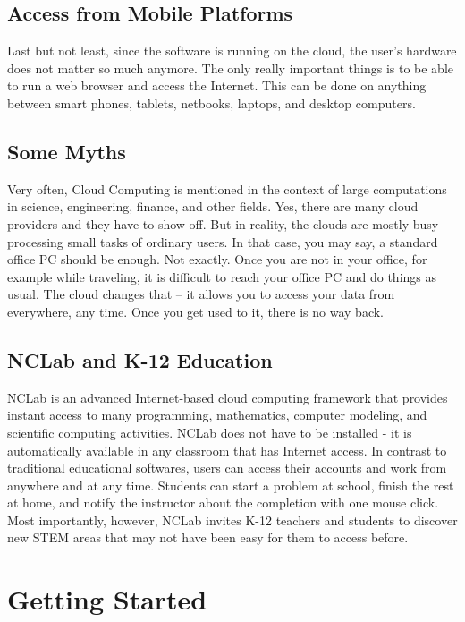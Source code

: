 \documentclass[article,A4,12pt]{llncs}
\begin{document}
\subsection{Access from Mobile Platforms}

Last but not least, since the software is running on the cloud, the user's hardware 
does not matter so much anymore. The only really important things is to be able to 
run a web browser and access the Internet. This can be done on anything between smart 
phones, tablets, netbooks, laptops, and desktop computers. 

\subsection{Some Myths}

Very often, Cloud Computing is mentioned in the context of large 
computations in science, engineering, finance, and other fields. Yes, there are many 
cloud providers and they have to show off. But in reality, the clouds are mostly
busy processing small tasks of ordinary users. In that case, you may say, a standard 
office PC should be enough. Not exactly. Once you are not in your office, for example
while traveling, it is difficult to reach your office PC and do things as usual. 
The cloud changes that -- it allows you to access your data 
from everywhere, any time. Once you get used to it, there is no way back. 

\subsection{NCLab and K-12 Education}

NCLab is an advanced Internet-based cloud computing framework that provides 
instant access to many programming, mathematics, computer
modeling, and scientific computing activities. NCLab does not have to be installed - it 
is automatically available in any classroom that has Internet access. In 
contrast to traditional educational softwares, 
users can access their accounts and work from anywhere and at any time.
Students can start a problem at school, finish the rest at home, and notify 
the instructor about the completion with one mouse click. Most importantly, 
however, NCLab invites K-12 teachers and students to discover new STEM areas
that may not have been easy for them to access before.

\newpage


\section{Getting Started}
\end{document}
